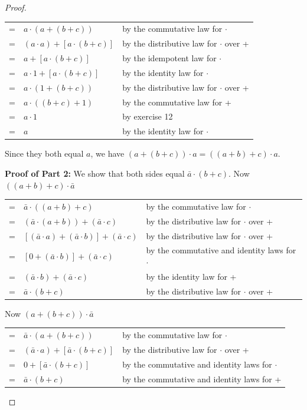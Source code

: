 \documentclass[14pt]{extarticle}
\newcommand{\cy}{\color{cyan}}
\begin{document}
\begin{proof}
\begin{center}
\begin{tabular}{cll}
= & \(a \cdot (a + (b+c))\) & {\cy by the commutative law for $\cdot$} \\
= & \((a \cdot a) + [a \cdot (b + c)]\) & {\cy by the distributive law for $\cdot$ over +} \\
= & \(a + [a \cdot (b + c)]\) & {\cy by the idempotent law for $\cdot$} \\
= & \(a \cdot 1 + [a \cdot (b + c)]\) & {\cy by the identity law for $\cdot$} \\
= & \(a \cdot (1 + (b + c))\) & {\cy by the distributive law for $\cdot$ over +} \\
= & \(a \cdot ((b + c) + 1)\) & {\cy by the commutative law for +} \\
= & \(a \cdot 1\) & {\cy by exercise 12} \\
= & \(a\) & {\cy by the identity law for $\cdot$}
\end{tabular}
\end{center}
Since they both equal $a$, we have \((a + (b + c)) \cdot a = ((a + b) + c) \cdot a\).

{\bf Proof of Part 2:} We show that both sides equal \(\bar{a} \cdot (b+c)\). Now \(((a + b) + c) \cdot \bar{a}\)

\begin{center}
\begin{tabular}{cll}
= & \(\bar{a} \cdot ((a + b) + c)\) & {\cy by the commutative law for $\cdot$} \\
= & \((\bar{a} \cdot (a + b)) + (\bar{a} \cdot c)\) & {\cy by the distributive law for $\cdot$ over +} \\
= & \([(\bar{a} \cdot a) + (\bar{a} \cdot b)] + (\bar{a} \cdot c)\) & {\cy by the distributive law for $\cdot$ over +} \\
= & \([0 + (\bar{a} \cdot b)] + (\bar{a} \cdot c)\) & {\cy by the commutative and identity laws for $\cdot$} \\
= & \((\bar{a} \cdot b) + (\bar{a} \cdot c)\) & {\cy by the identity law for +} \\
= & \(\bar{a} \cdot (b + c)\) & {\cy by the distributive law for $\cdot$ over +}
\end{tabular}
\end{center}

Now \((a + (b + c)) \cdot \bar{a}\)

\begin{center}
\begin{tabular}{cll}
= & \(\bar{a} \cdot (a + (b+c))\) & {\cy by the commutative law for $\cdot$} \\
= & \((\bar{a} \cdot a) + [\bar{a} \cdot (b + c)]\) & {\cy by the distributive law for $\cdot$ over +} \\
= & \(0 + [\bar{a} \cdot (b + c)]\) & {\cy by the commutative and identity laws for $\cdot$} \\
= & \(\bar{a} \cdot (b + c)\) & {\cy by the commutative and identity laws for +}
\end{tabular}
\end{center}


\end{proof}
\end{document}
